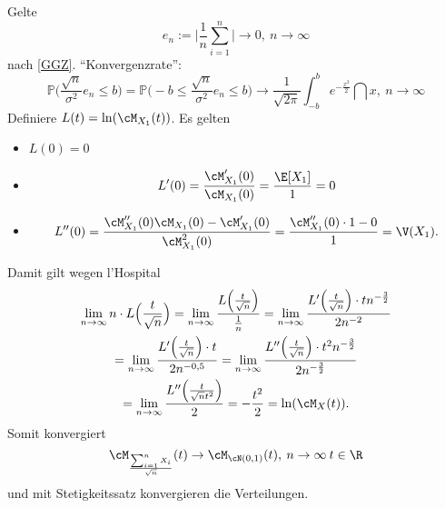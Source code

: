 \begin{bem1}
	Gelte \[ e_n := \Big| \frac{1}{n} \sum\limits_{i=1}^{n} \Big| \to 0, \: n \to \infty
	\]
	nach \ref{GGZ}. \enquote{Konvergenzrate}:
	\[ \mathbb{P}\Big(\frac{\sqrt{n}}{\sigma^2} e_n \leq b\Big) = \mathbb{P}\Big( -b \leq \frac{\sqrt{n}}{\sigma^2} e_n \leq b \Big) \to \frac{1}{\sqrt{2 \pi}} \int_{-b}^{b} e^{-\frac{x^2}{2}} \dint x, \: n \to \infty \]
	Definiere $L(t) = \ln (\cM_{X_1}(t))$. Es gelten
	\begin{itemize}
		\item $L(0) = 0$
		\item \[ L'(0) = \frac{\cM_{X_1}'(0)}{\cM_{X_1}(0)} = \frac{\E[X_1]}{1} = 0 \]
		\item \[ L''(0) = \frac{\cM_{X_1}''(0) \cM_{X_1}(0) - \cM_{X_1}'(0)}{\cM_{X_1}^2(0)} = \frac{\cM_{X_1}''(0) \cdot 1 - 0}{1} = \V(X_1). \]
	\end{itemize}
	Damit gilt wegen l’Hospital 
	\begin{gather*}
		\lim\limits_{n\to\infty} n \cdot L\Big(\frac{t}{\sqrt{n}}\Big) = \lim\limits_{n\to\infty} \frac{L\Big(\frac{t}{\sqrt{n}}\Big)}{\frac{1}{n}} = \lim\limits_{n\to\infty} \frac{L'\Big(\frac{t}{\sqrt{n}}\Big) \cdot t n^{-\frac{3}{2}} }{2n^{-2}}\\
		= \lim\limits_{n\to\infty} \frac{L'\Big(\frac{t}{\sqrt{n}}\Big) \cdot t}{2n^{-0{,}5}} = \lim\limits_{n\to\infty} \frac{L''\Big(\frac{t}{\sqrt{n}}\Big) \cdot t^2 n^{-\frac{3}{2}}}{2n^{-\frac{3}{2}}}\\ 
		= \lim\limits_{n\to\infty} \frac{L''\Big(\frac{t}{\sqrt{n}t^2}\Big)}{2} = -\frac{t^2}{2} = \ln(\cM_X(t)).\\
	\end{gather*}
	Somit konvergiert \[ \cM_{\frac{\sum_{i=1}^{n} X_i}{\sqrt{n}}}(t) \to \cM_{\cN(0,1)}(t), \: n \to \infty \: t \in \R \]
	und mit Stetigkeitssatz konvergieren die Verteilungen.
\end{bem1}